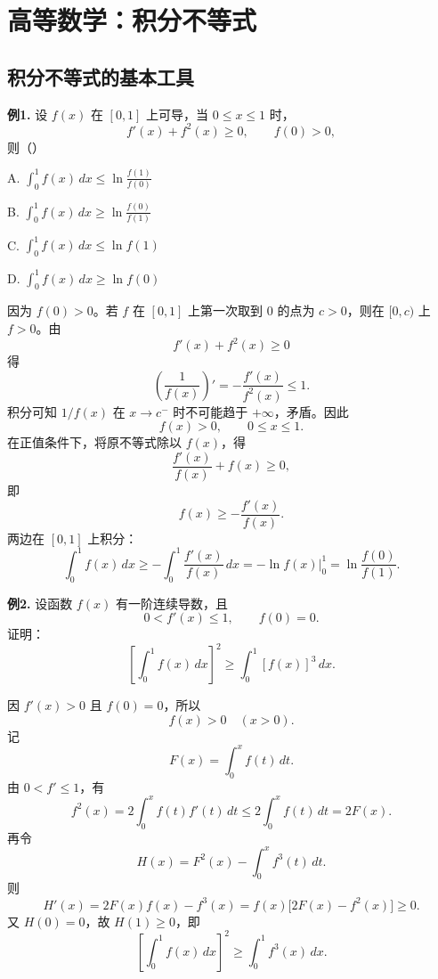 \chapter{高等数学：积分不等式}

\section{积分不等式的基本工具}

\begin{problemblock}
\textbf{例1.} 设 \(f(x)\) 在 \([0,1]\) 上可导，当 \(0\le x\le1\) 时，
\[
f'(x)+f^2(x)\ge0,\qquad f(0)>0,
\]
则（\quad）

A. \(\displaystyle\int_0^1f(x)\,dx\le\ln\frac{f(1)}{f(0)}\)

B. \(\displaystyle\int_0^1f(x)\,dx\ge\ln\frac{f(0)}{f(1)}\)

C. \(\displaystyle\int_0^1f(x)\,dx\le\ln f(1)\)

D. \(\displaystyle\int_0^1f(x)\,dx\ge\ln f(0)\)
\end{problemblock}
\begin{solutionblock}
因为 \(f(0)>0\)。若 \(f\) 在 \([0,1]\) 上第一次取到 \(0\) 的点为 \(c>0\)，则在 \([0,c)\) 上 \(f>0\)。由
\[
f'(x)+f^2(x)\ge0
\]
得
\[
\left(\frac1{f(x)}\right)'=-\frac{f'(x)}{f^2(x)}\le1.
\]
积分可知 \(1/f(x)\) 在 \(x\to c^-\) 时不可能趋于 \(+\infty\)，矛盾。因此
\[
f(x)>0,\qquad 0\le x\le1.
\]
在正值条件下，将原不等式除以 \(f(x)\)，得
\[
\frac{f'(x)}{f(x)}+f(x)\ge0,
\]
即
\[
f(x)\ge-\frac{f'(x)}{f(x)}.
\]
两边在 \([0,1]\) 上积分：
\[
\int_0^1 f(x)\,dx
\ge-\int_0^1\frac{f'(x)}{f(x)}\,dx
=-\ln f(x)\bigg|_0^1
=\ln\frac{f(0)}{f(1)}.
\]
\end{solutionblock}

\begin{problemblock}
\textbf{例2.} 设函数 \(f(x)\) 有一阶连续导数，且
\[
0<f'(x)\le1,\qquad f(0)=0.
\]
证明：
\[
\left[\int_0^1f(x)\,dx\right]^2
\ge
\int_0^1[f(x)]^3\,dx.
\]
\end{problemblock}
\begin{solutionblock}
因 \(f'(x)>0\) 且 \(f(0)=0\)，所以
\[
f(x)>0\quad (x>0).
\]
记
\[
F(x)=\int_0^x f(t)\,dt.
\]
由 \(0<f'\le1\)，有
\[
f^2(x)=2\int_0^x f(t)f'(t)\,dt
\le2\int_0^x f(t)\,dt=2F(x).
\]
再令
\[
H(x)=F^2(x)-\int_0^x f^3(t)\,dt.
\]
则
\[
H'(x)=2F(x)f(x)-f^3(x)
=f(x)\bigl[2F(x)-f^2(x)\bigr]\ge0.
\]
又 \(H(0)=0\)，故 \(H(1)\ge0\)，即
\[
\left[\int_0^1f(x)\,dx\right]^2
\ge
\int_0^1f^3(x)\,dx.
\]
\end{solutionblock}

